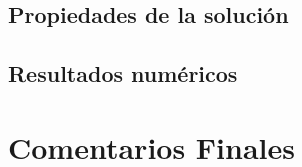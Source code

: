 \documentclass[10pt]{beamer}
\begin{document}
        \subsection{Propiedades de la solución}
            
        \subsection{Resultados numéricos}
        
    \section{Comentarios Finales}
        
    \appendix
        
\end{document}
